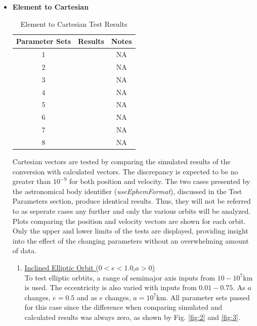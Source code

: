 \begin{itemize}
	\item \textbf{Element to Cartesian}
	\begin{table}[H]
		\caption{Element to Cartesian Test Results}
		\label{tab:Cart to Elem results}
		\centering \fontsize{10}{10}\selectfont
		\begin{tabular}{c|c|c}
			\hline
			\textbf{Parameter Sets} & \textbf{Results} & \textbf{Notes} 									\\ \hline
			1 & \color{Green}{PASSED} & NA\\
			2 & \color{Green}{PASSED} & NA\\
			3 & \color{Green}{PASSED} & NA\\
			4 & \color{Green}{PASSED} & NA\\
			5 & \color{Green}{PASSED} & NA\\
			6 & \color{Green}{PASSED} & NA\\
			7 & \color{Green}{PASSED} & NA\\
			8 & \color{Green}{PASSED} & NA\\
			\hline
		\end{tabular}
	\end{table}
	Cartesian vectors are tested by comparing the simulated results of the conversion with calculated vectors. The discrepancy is expected to be no greater than $10^{-9}$ for both position and velocity. The two cases presented by the astronomical body identifier (\textit{useEphemFormat}), discussed in the Test Parameters section, produce identical results. Thus, they will not be referred to as seperate cases any further and only the various orbits will be analyzed. Plots comparing the position and velocity vectors are shown for each orbit. Only the upper and lower limits of the tests are displayed, providing insight into the effect of the changing parameters without an overwhelming amount of data.
	\begin{enumerate}
		\item \underline{Inclined Elliptic Orbit ($0<e<1.0$,\quad $a>0$)}\\
		To test elliptic orbtits, a range of semimajor axis inputs from $10-10^7$km is used. The eccentricity is also varied with inputs from $0.01-0.75$. As $a$ changes, $e=0.5$ and as $e$ changes, $a=10^7$km. All parameter sets passed for this case since the difference when comparing simulated and calculated results was always zero, as shown by Fig. \ref{fig:2} and \ref{fig:3}.
		\begin{figure}[H] 
			\centering

\end{figure}
\end{enumerate}
\end{itemize}
